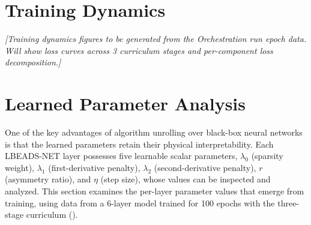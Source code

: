 \section{Training Dynamics}
\label{sec:results_training}




\textit{[Training dynamics figures to be generated from the Orchestration run epoch data. Will show loss curves across 3 curriculum stages and per-component loss decomposition.]}


\section{Learned Parameter Analysis}
\label{sec:results_params}

One of the key advantages of algorithm unrolling over black-box neural networks is that the learned parameters retain their physical interpretability. Each LBEADS-NET layer possesses five learnable scalar parameters, $\lambda_0$ (sparsity weight), $\lambda_1$ (first-derivative penalty), $\lambda_2$ (second-derivative penalty), $r$ (asymmetry ratio), and $\eta$ (step size), whose values can be inspected and analyzed. This section examines the per-layer parameter values that emerge from training, using data from a 6-layer model trained for 100 epochs with the three-stage curriculum ().


